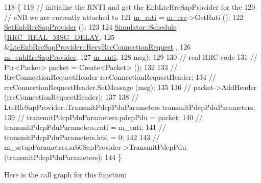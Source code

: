 \begin{DoxyCode}
118 \{
119   \textcolor{comment}{// initialize the RNTI and get the EnbLteRrcSapProvider for the}
120   \textcolor{comment}{// eNB we are currently attached to}
121   \hyperlink{classns3_1_1LteUeRrcProtocolReal_a8474d4cb6038e0e43ee542f7ce7b193d}{m\_rnti} = \hyperlink{classns3_1_1LteUeRrcProtocolReal_a8fdc7ce050a1325bac8fd0a851f22a1c}{m\_rrc}->GetRnti ();
122   \hyperlink{classns3_1_1LteUeRrcProtocolReal_a332253a9f192cd34ed5e8840ce84e474}{SetEnbRrcSapProvider} ();
123 
124   \hyperlink{classns3_1_1Simulator_a671882c894a08af4a5e91181bf1eec13}{Simulator::Schedule} (\hyperlink{namespacens3_a8e3f859197e39602ba3ea59033f00404}{RRC\_REAL\_MSG\_DELAY}, 
125                        &\hyperlink{classns3_1_1LteEnbRrcSapProvider_a6a49a245760fe748a1e959e92c9cc313}{LteEnbRrcSapProvider::RecvRrcConnectionRequest}
      ,
126                        \hyperlink{classns3_1_1LteUeRrcProtocolReal_a0293106f91668a44472470093622ad7b}{m\_enbRrcSapProvider},
127                        \hyperlink{classns3_1_1LteUeRrcProtocolReal_a8474d4cb6038e0e43ee542f7ce7b193d}{m\_rnti}, 
128                        msg);
129 
130   \textcolor{comment}{// real RRC code}
131   \textcolor{comment}{// Ptr<Packet> packet = Create<Packet> ();}
132 
133   \textcolor{comment}{// RrcConnectionRequestHeader rrcConnectionRequestHeader;}
134   \textcolor{comment}{// rrcConnectionRequestHeader.SetMessage (msg);}
135 
136   \textcolor{comment}{// packet->AddHeader (rrcConnectionRequestHeader);}
137 
138   \textcolor{comment}{// LteRlcSapProvider::TransmitPdcpPduParameters transmitPdcpPduParameters;}
139   \textcolor{comment}{// transmitPdcpPduParameters.pdcpPdu = packet;}
140   \textcolor{comment}{// transmitPdcpPduParameters.rnti = m\_rnti;}
141   \textcolor{comment}{// transmitPdcpPduParameters.lcid = 0;}
142 
143   \textcolor{comment}{// m\_setupParameters.srb0SapProvider->TransmitPdcpPdu (transmitPdcpPduParameters);}
144 \}
\end{DoxyCode}


Here is the call graph for this function\+:


